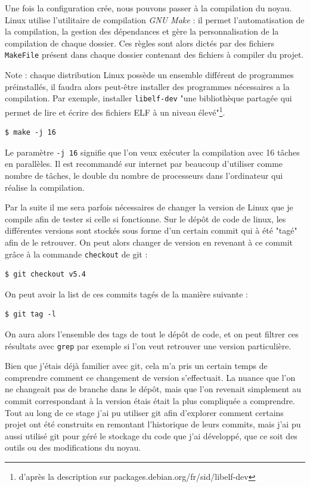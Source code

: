 Une fois la configuration crée, nous pouvons passer à la compilation du noyau. Linux utilise l'utilitaire de compilation \textit{GNU Make} : il permet l'automatisation de la compilation, la gestion des dépendances et gère la personnalisation de la compilation de chaque dossier. Ces règles sont alors dictés par des fichiers \texttt{MakeFile} présent dans chaque dossier contenant des fichiers à compiler du projet.

Note : chaque distribution Linux possède un ensemble différent de programmes préinstallés, il faudra alors peut-être installer des programmes nécessaires a la compilation. Par exemple, installer \texttt{libelf-dev} "une bibliothèque partagée qui permet de lire et écrire des fichiers ELF à un niveau élevé"\footnote{d'après la description sur packages.debian.org/fr/sid/libelf-dev}. 

\begin{lstlisting}[style=command] 
$ make -j 16
\end{lstlisting}

Le paramètre \texttt{-j 16} signifie que l'on veux exécuter la compilation avec 16 tâches en parallèles. Il est recommandé sur internet par beaucoup d'utiliser comme nombre de tâches, le double du nombre de processeurs dans l'ordinateur qui réalise la compilation.

Par la suite il me sera parfois nécessaires de changer la version de Linux que je compile afin de tester si celle si fonctionne. Sur le dépôt de code de linux, les différentes versions sont stockés sous forme d'un certain commit qui à été "tagé" afin de le retrouver. On peut alors changer de version en revenant à ce commit grâce à la commande \texttt{checkout} de \gls{git} : 
\begin{lstlisting}[style=command]
$ git checkout v5.4
\end{lstlisting}
On peut avoir la list de ces commits tagés de la manière suivante : 
\begin{lstlisting}[style=command]
$ git tag -l
\end{lstlisting}
On aura alors l'ensemble des tags de tout le dépôt de code, et on peut filtrer ces résultats avec \texttt{grep} par exemple si l'on veut retrouver une version particulière.

Bien que j'étais déjà familier avec git, cela m'a pris un certain temps de comprendre comment ce changement de version s'effectuait. La nuance que l'on ne changeait pas de branche dans le dépôt, mais que l'on revenait simplement au commit correspondant à la version étais était la plus compliquée a comprendre. Tout au long de ce stage j'ai pu utiliser \gls{git} afin d'explorer comment certains projet ont été construits en remontant l'historique de leurs commits, mais j'ai pu aussi utilisé \gls{git} pour géré le stockage du code que j'ai développé, que ce soit des outils ou des modifications du noyau.  


